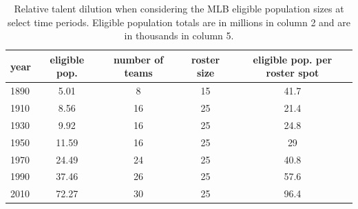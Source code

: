 \documentclass[11pt]{article}\usepackage[]{graphicx}\usepackage[]{color}
\begin{document}
\begin{table}[h!]
\begin{center}
\begin{tabular}{lcccc}
\hline
year & eligible pop. & number of teams & roster size & eligible pop. per roster spot \\
\hline
1890 & 5.01  & 8  & 15 & 41.7   \\
1910 & 8.56  & 16 & 25 & 21.4  \\
1930 & 9.92  & 16 & 25 & 24.8  \\
1950 & 11.59  & 16 & 25 & 29  \\
1970 & 24.49  & 24 & 25 & 40.8  \\
1990 & 37.46 & 26 & 25 & 57.6 \\
2010 & 72.27 & 30 & 25 & 96.4 \\
\hline
\end{tabular}
\end{center}
\caption{Relative talent dilution when considering the MLB eligible population 
  sizes at select time periods. Eligible population totals are in millions in 
  column 2 and are in thousands in column 5. }
\label{dilution}
\end{table}
\end{document}
